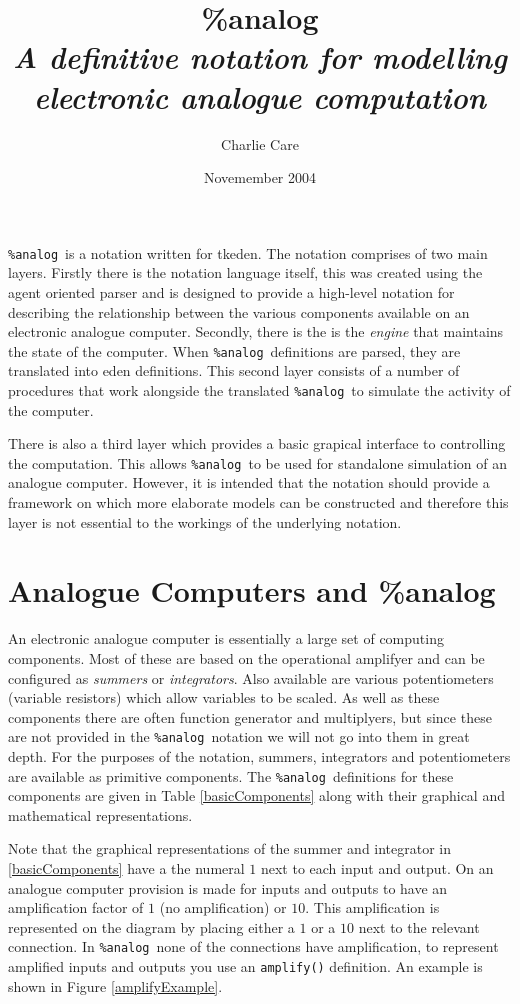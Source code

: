 \documentclass[a4paper,10pt]{article}
\title{\%analog \\ \itshape \large
   A definitive notation for modelling \\electronic analogue computation}
\author{Charlie Care}
\date{Novemember 2004}
\newcommand{\analog}{\texttt{\%analog}}
\begin{document}
\maketitle

\analog\ is a notation written for tkeden. 
The notation comprises of two main layers. Firstly there is the notation language itself, this was created using the agent oriented parser and is designed to provide a high-level notation for describing the relationship between the various components available on an electronic analogue computer. Secondly, there is the is the \emph{engine} that maintains the state of the computer. When \analog\ definitions are parsed, they are translated into eden definitions. This second layer consists of a number of procedures that work alongside the translated \analog\ to simulate the activity of the computer.

There is also a third layer which provides a basic grapical interface to controlling the computation. This allows \analog\ to be used for standalone simulation of an analogue computer. However, it is intended that the notation should provide a framework on which more elaborate models can be constructed and therefore this layer is not essential to the workings of the underlying notation.

\section{Analogue Computers and \%analog}
An electronic analogue computer is essentially a large set of computing components. Most of these are based on the operational amplifyer and can be configured as \emph{summers} or \emph{integrators}. Also available are various potentiometers (variable resistors) which allow variables to be scaled. As well as these components there are often function generator and multiplyers, but since these are not provided in the \analog\ notation
we will not go into them in great depth. For the purposes of the notation, summers, integrators and potentiometers are available as primitive components. The \analog\ definitions for these components are given in Table \ref{basicComponents} along with their graphical and mathematical representations.

Note that the graphical representations of the summer and integrator in \ref{basicComponents} have a the numeral $1$ next to each input and output. On an analogue computer provision is made for inputs and outputs to have an amplification factor of $1$ (no amplification) or $10$. This amplification is represented on the diagram by placing either a $1$ or a $10$ next to the relevant connection.
In \analog\ none of the connections have amplification, to represent amplified inputs and outputs you use an \texttt{amplify()} definition. 
An example is shown in Figure \ref{amplifyExample}.
\end{document}
